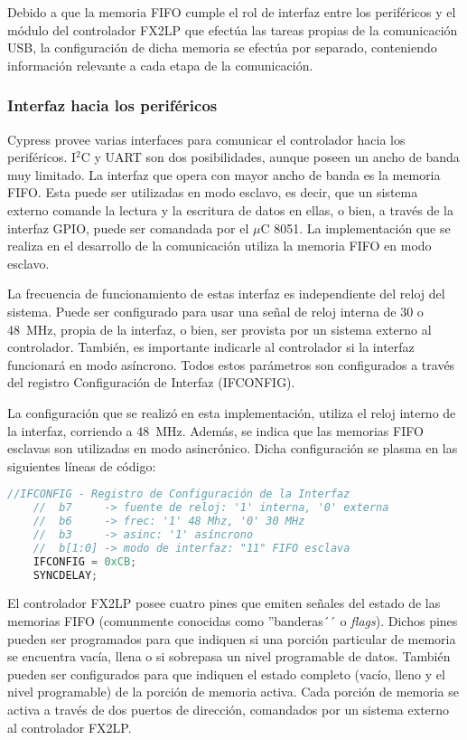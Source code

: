 	Debido a que la memoria FIFO cumple el rol de interfaz entre los periféricos y el módulo del controlador FX2LP que efectúa las tareas propias de la comunicación USB, la configuración de dicha memoria se efectúa por separado, conteniendo información relevante a cada etapa de la comunicación.
	
\subsubsection{Interfaz hacia los periféricos}
	Cypress provee varias interfaces para comunicar el controlador hacia los periféricos. I$^2$C y UART son dos posibilidades, aunque poseen un ancho de banda muy limitado. La interfaz que opera con mayor ancho de banda es la memoria FIFO. Esta puede ser utilizadas en modo esclavo, es decir, que un sistema externo comande la lectura y la escritura de datos en ellas, o bien, a través de la interfaz GPIO, puede ser comandada por el $\mu$C 8051. La implementación que se realiza en el desarrollo de la comunicación utiliza la memoria FIFO en modo esclavo.
	
	La frecuencia de funcionamiento de estas interfaz es independiente del reloj del sistema. Puede ser configurado para usar una señal de reloj interna de \si{30} o \SI{48}{\mega\hertz}, propia de la interfaz, o bien, ser provista por un sistema externo al controlador. También, es importante indicarle al controlador si la interfaz funcionará en modo asíncrono. Todos estos parámetros son configurados a través del registro Configuración de Interfaz (IFCONFIG).
	
	La configuración que se realizó en esta implementación, utiliza el reloj interno de la interfaz, corriendo a \SI{48}{\mega\hertz}. Además, se indica que las memorias FIFO esclavas son utilizadas en modo asincrónico. Dicha configuración se plasma en las siguientes líneas de código:
	
	\begin{lstlisting}[language=C,backgroundcolor=\color{gray!30}]
	//IFCONFIG - Registro de Configuración de la Interfaz
	//	b7 	   -> fuente de reloj: '1' interna, '0' externa
	//	b6 	   -> frec: '1' 48 Mhz, '0' 30 MHz
	//	b3 	   -> asinc: '1' asíncrono
	//	b[1:0] -> modo de interfaz: "11" FIFO esclava
	IFCONFIG = 0xCB;
	SYNCDELAY;
	\end{lstlisting}

	El controlador FX2LP posee cuatro pines que emiten señales del estado de las memorias FIFO (comunmente conocidas como ''banderas´´ o \textit{flags}). Dichos pines pueden ser programados para que indiquen si una porción particular de memoria se encuentra vacía, llena o si sobrepasa un nivel programable de datos. También pueden ser configurados para que indiquen el estado completo (vacío, lleno y el nivel programable) de la porción de memoria activa. Cada porción de memoria se activa a través de dos puertos de dirección, comandados por un sistema externo al controlador FX2LP.
	
